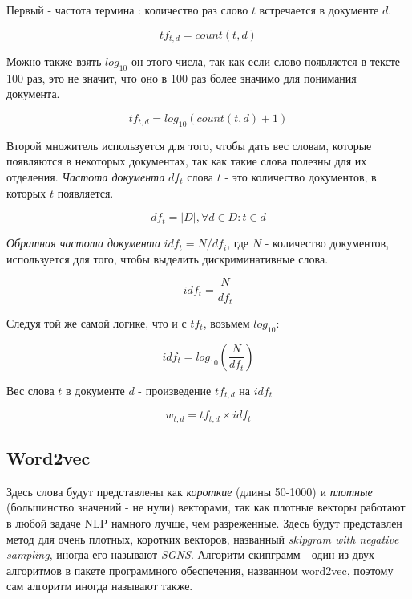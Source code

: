 \documentclass[a4paper,12pt,preview]{report} %
\begin{document}
	Первый - частота термина \cite{12}: количество раз слово $t$ встречается в документе $d$.
	
	\begin{equation}
	tf_{t,d} = count(t, d)
	\end{equation}
	
	Можно также взять $log_{10}$ он этого числа, так как если слово появляется в тексте 100 раз, это не значит, что оно в 100 раз более значимо для понимания документа.
	
	\begin{equation}
	tf_{t,d} = log_{10}(count(t, d) + 1)
	\end{equation}
	
	Второй множитель используется для того, чтобы дать вес словам, которые появляются в некоторых документах, так как такие слова полезны для их отделения. \textit{Частота документа} $df_t$ слова $t$ - это количество документов, в которых $t$ появляется. 
	
	\begin{equation}
	df_t = |D|, \forall d \in D: t \in d
	\end{equation}
	
	\textit{Обратная частота документа} $idf_t = N / df_i$, где $N$ - количество документов, используется для того, чтобы выделить дискриминативные слова.  
	
	\begin{equation}
	idf_t = \dfrac{N}{df_t}
	\end{equation}
	
	Следуя той же самой логике, что и с $tf_t$, возьмем $log_{10}$:
	
	\begin{equation}
	idf_t = log_{10} (\dfrac{N}{df_t})
	\end{equation}
	
	Вес слова $t$ в документе $d$ - произведение $tf_{t, d}$ на $idf_t$
	
	\begin{equation}
	w_{t, d} = tf_{t, d} \times idf_t
	\end{equation}
	
	\subsection{Word2vec}
	
	Здесь слова будут представлены как \textit{короткие} (длины 50-1000) и \textit{плотные} (большинство значений - не нули) векторами, так как плотные векторы работают в любой задаче NLP намного лучше, чем разреженные. Здесь будут представлен метод для очень плотных, коротких векторов, названный \textit{skipgram with negative sampling}, иногда его называют \textit{SGNS}. Алгоритм скипграмм - один из двух алгоритмов в пакете программного обеспечения, названном word2vec, поэтому сам алгоритм иногда называют также.
	
\end{document}
